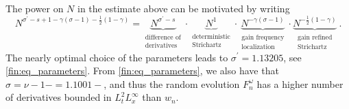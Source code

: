 \documentclass[11pt]{article}
\begin{document}
\begin{rem}
The power on \( N \) in the estimate above can be motivated by writing
\begin{equation*}
N^{\sigma^\prime -s +1- \gamma (\sigma-1) - \frac{1}{2} (1-\gamma) }= \underbrace{N^{\sigma^\prime-s}}_{\substack{\text{difference of}\\\text{derivatives}}} \cdot \underbrace{N^1}_{\substack{\text{deterministic}\\ \text{Strichartz}}} \cdot \underbrace{{N^{-\gamma(\sigma-1)}}}_{\substack{\text{gain frequency}\\ \text{localization}}} \cdot \underbrace{N^{-\frac{1}{2}(1-\gamma)}}_{\substack{\text{gain refined}\\\text{Strichartz}}}~.
\end{equation*}
The nearly optimal choice of the parameters leads to \( \sigma^\prime = 1.13205 \), see \eqref{fin:eq_parameters}. From \eqref{fin:eq_parameters}, we also have that \( {\sigma= \nu-1-=1.1001-} \), and thus the random evolution \( F_n^\omega \) has a higher number of derivatives bounded in \( L_t^2 L_x^\infty \) than \( w_n \).
\end{rem}
\end{document}
